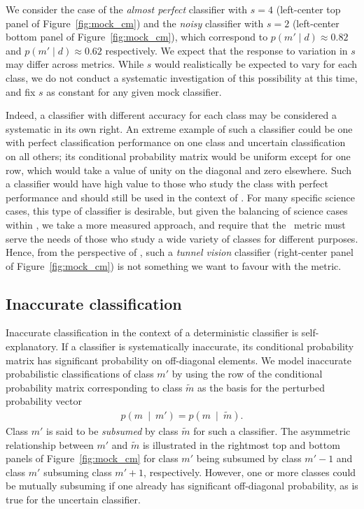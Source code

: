 We consider the case of the \textit{almost perfect} classifier with $s=4$ (left-center top panel of Figure~\ref{fig:mock_cm}) and the \textit{noisy} classifier with $s=2$ (left-center bottom panel of Figure~\ref{fig:mock_cm}), which correspond to $p(m' \mid d)\approx0.82$ and $p(m' \mid d)\approx0.62$ respectively. We expect that the response to variation in $s$ may differ across metrics.
While $s$ would realistically be expected to vary for each class, we do not conduct a systematic investigation of this possibility at this time, and fix $s$ as constant for any given mock classifier.

Indeed, a classifier with different accuracy for each class may be considered a systematic in its own right.
An extreme example of such a classifier could be one with perfect classification performance on one class and uncertain classification on all others; its conditional probability matrix would be uniform except for one row, which would take a value of unity on the diagonal and zero elsewhere.
Such a classifier would have high value to those who study the class with perfect performance and should still be used in the context of \lsst.
For many specific science cases, this type of classifier is desirable, but given the balancing of science cases within \lsst, we take a more measured approach, and require that the \plasticc\ metric must serve the needs of those who study a wide variety of classes for different purposes.
Hence, from the perspective of \plasticc, such a \textit{tunnel vision} classifier (right-center panel of Figure~\ref{fig:mock_cm}) is not something we want to favour with the metric.

\subsection{Inaccurate classification}
\label{sec:inaccuratedata}

Inaccurate classification in the context of a deterministic classifier is self-explanatory.
If a classifier is systematically inaccurate, its conditional probability matrix has significant probability on off-diagonal elements.
We model inaccurate probabilistic classifications of class $m'$ by using the row of the conditional probability matrix corresponding to class $\tilde{m}$ as the basis for the perturbed probability vector
\begin{eqnarray}
  \label{eq:subsume}
  p(m\ \mid\ m') = p(m\ \mid\ \tilde{m}).
\end{eqnarray}
Class $m'$ is said to be \textit{subsumed} by class $\tilde{m}$ for such a classifier.
The asymmetric relationship between $m'$ and $\tilde{m}$ is illustrated in the rightmost top and bottom panels of Figure~\ref{fig:mock_cm} for class $m'$ being subsumed by class $m'-1$ and class $m'$ subsuming class $m'+1$, respectively.
However, one or more classes could be mutually subsuming if one already has significant off-diagonal probability, as is true for the uncertain classifier.

